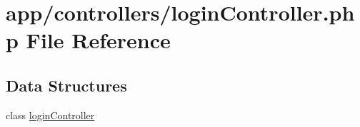 \hypertarget{login_controller_8php}{}\section{app/controllers/login\+Controller.php File Reference}
\label{login_controller_8php}
\subsection*{Data Structures}
\begin{DoxyCompactItemize}
\item 
class \hyperlink{classlogin_controller}{login\+Controller}
\end{DoxyCompactItemize}
